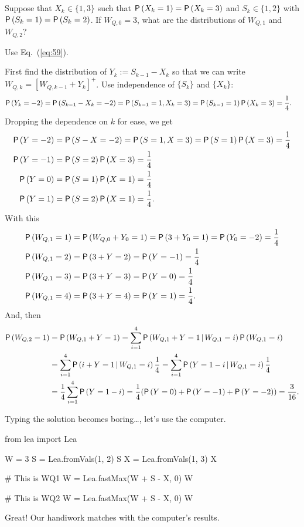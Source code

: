 \begin{exercise}
  Suppose that $X_k\in\{1,3\}$ such that $\P{X_k=1}=\P{X_k=3}$ and
  $S_k\in\{1,2\}$ with $\P{S_k=1}=\P{S_k=2}$. If $W_{Q,0}=3$, what are
  the distributions of $W_{Q,1}$ and $W_{Q,2}$?  
  \begin{hint}
Use Eq.~(\ref{eq:59}).
\end{hint}
\begin{solution}  First find the distribution of $Y_k:=S_{k-1}-X_k$ so that we can write
  $W_{Q,k}=[W_{Q,k-1}+Y_k]^+$.  Use independence of $\{S_k\}$ and $\{X_k\}$:
\begin{align*}
  \P{Y_k=-2} &=\P{S_{k-1}-X_k=-2} = \P{S_{k-1}=1, X_k=3} = \P{S_{k-1}=1}\P{X_k=3} = \frac14.
\end{align*}
Dropping the dependence on $k$ for ease, we get
\begin{align*}
  \P{Y=-2} &=\P{S-X=-2} = \P{S=1, X=3} = \P{S=1}\P{X=3} = \frac14\\
  \P{Y=-1} &=\P{S=2}\P{X=3} = \frac14\\
  \P{Y=0} &=\P{S=1}\P{X=1} = \frac14\\
  \P{Y=1} &=\P{S=2}\P{X=1} = \frac14.
\end{align*}
With this
  \begin{align*}
    \P{W_{Q,1} = 1} &=\P{W_{Q,0} + Y_0= 1} = \P{3 + Y_0 =1} = \P{Y_0=-2} =\frac14\\
    \P{W_{Q,1} = 2} &= \P{3 + Y =2} = \P{Y=-1}  =\frac14\\
    \P{W_{Q,1} = 3} &= \P{3 + Y = 3} = \P{Y=0}  =\frac14\\
    \P{W_{Q,1} = 4} &= \P{3 + Y = 4} = \P{Y=1}  =\frac14.\\
  \end{align*}
And, then
  \begin{equation*}
    \begin{split}
    \P{W_{Q,2} = 1} 
&=\P{W_{Q,1} + Y = 1} = \sum_{i=1}^4 \P{W_{Q,1} + Y = 1\given W_{Q,1}=i}\P{W_{Q,1}=i}\\
&=\sum_{i=1}^4 \P{i + Y = 1\given W_{Q,1}=i}\frac14
=\sum_{i=1}^4 \P{Y = 1-i\given W_{Q,1}=i}\frac14\\
&=\frac14\sum_{i=1}^4 \P{Y = 1-i} = \frac14(\P{Y = 0} + \P{Y=-1} +\P{Y=-2}) = \frac{3}{16}.
    \end{split}
  \end{equation*}

Typing the solution becomes  boring\ldots, let's use the computer.

\begin{pyconsole}
from lea import Lea

W = 3
S = Lea.fromVals(1,  2)
S
X = Lea.fromVals(1,  3)
X

# This is WQ1
W = Lea.fastMax(W + S - X, 0)
W

# This is WQ2
W = Lea.fastMax(W + S - X, 0)
W
\end{pyconsole}
Great! Our handiwork matches with the computer's results. 

\end{solution}
\end{exercise}


